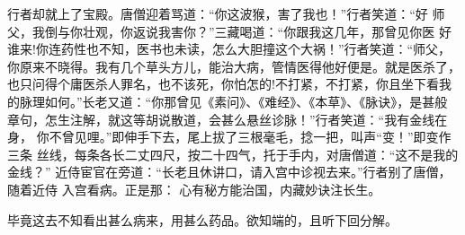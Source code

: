 行者却就上了宝殿。唐僧迎着骂道：“你这波猴，害了我也！”行者笑道：“好
师父，我倒与你壮观，你返说我害你？”三藏喝道：“你跟我这几年，那曾见你医
好谁来!你连药性也不知，医书也未读，怎么大胆撞这个大祸！”行者笑道：“师父，
你原来不晓得。我有几个草头方儿，能治大病，管情医得他好便是。就是医杀了，
也只问得个庸医杀人罪名，也不该死，你怕怎的!不打紧，不打紧，你且坐下看我
的脉理如何。”长老又道：“你那曾见《素问》、《难经》、《本草》、《脉诀》，是甚般
章句，怎生注解，就这等胡说散道，会甚么悬丝诊脉！”行者笑道：“我有金线在身，
你不曾见哩。”即伸手下去，尾上拔了三根毫毛，捻一把，叫声“变！”即变作三条
丝线，每条各长二丈四尺，按二十四气，托于手内，对唐僧道：“这不是我的金线？”
近侍宦官在旁道：“长老且休讲口，请入宫中诊视去来。”行者别了唐僧，随着近侍
入宫看病。正是那：
心有秘方能治国，内藏妙诀注长生。

毕竟这去不知看出甚么病来，用甚么药品。欲知端的，且听下回分解。